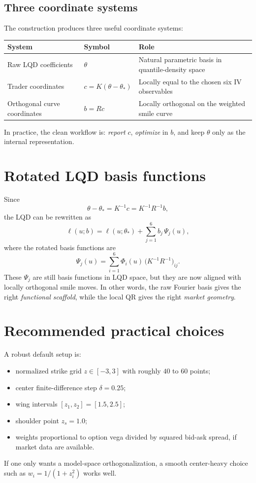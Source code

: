 \documentclass[11pt]{article}
\begin{document}
\subsection{Three coordinate systems}
The construction produces three useful coordinate systems:
\begin{center}
\begin{tabular}{>{\raggedright\arraybackslash}p{2.3cm} >{\raggedright\arraybackslash}p{3.2cm} p{7.0cm}}
\toprule
System & Symbol & Role \\
\midrule
Raw LQD coefficients & $\theta$ & Natural parametric basis in quantile-density space \\
Trader coordinates & $c = K(\theta-\theta_*)$ & Locally equal to the chosen six IV observables \\
Orthogonal curve coordinates & $b = Rc$ & Locally orthogonal on the weighted smile curve \\
\bottomrule
\end{tabular}
\end{center}
In practice, the clean workflow is: \emph{report} $c$, \emph{optimize} in $b$, and keep $\theta$ only as the internal representation.

\section{Rotated LQD basis functions}
Since
\[
\theta-\theta_* = K^{-1}c = K^{-1}R^{-1}b,
\]
the LQD can be rewritten as
\begin{equation}
\ell(u;b)
= \ell(u;\theta_*) + \sum_{j=1}^6 b_j\,\Psi_j(u),
\label{eq:rotated-lqd}
\end{equation}
where the rotated basis functions are
\begin{equation}
\Psi_j(u) = \sum_{i=1}^6 \Phi_i(u)\,\bigl(K^{-1}R^{-1}\bigr)_{ij}.
\label{eq:rotated-basis}
\end{equation}
These $\Psi_j$ are still basis functions in LQD space, but they are now aligned with locally orthogonal smile moves. In other words, the raw Fourier basis gives the right \emph{functional scaffold}, while the local QR gives the right \emph{market geometry}.

\section{Recommended practical choices}
A robust default setup is:
\begin{itemize}[leftmargin=1.8em]
\item normalized strike grid $z \in [-3,3]$ with roughly $40$ to $60$ points;
\item center finite-difference step $\delta = 0.25$;
\item wing intervals $[z_1,z_2] = [1.5,2.5]$;
\item shoulder point $z_s = 1.0$;
\item weights proportional to option vega divided by squared bid-ask spread, if market data are available.
\end{itemize}
If one only wants a model-space orthogonalization, a smooth center-heavy choice such as $w_i = 1/(1+z_i^2)$ works well.
\end{document}
